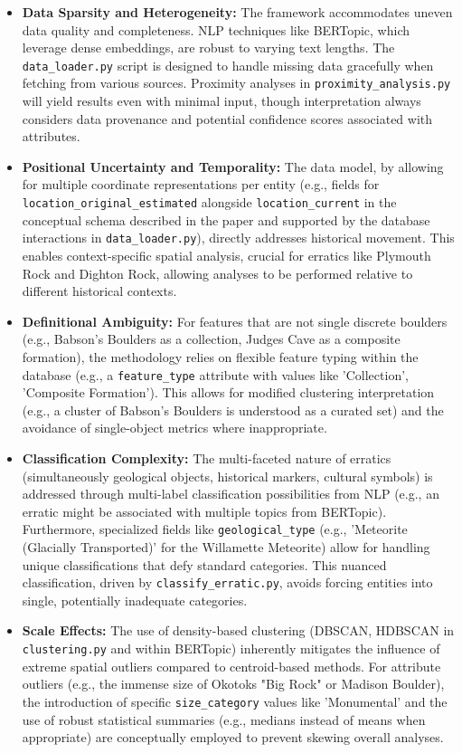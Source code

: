 \documentclass[
11pt, %
english, %
singlespacing, %
headsepline, %
]{MastersDoctoralThesis} %
\begin{document}
\begin{itemize}
    \item \textbf{Data Sparsity and Heterogeneity:} The framework accommodates uneven data quality and completeness. NLP techniques like BERTopic, which leverage dense embeddings, are robust to varying text lengths. The \texttt{data\_loader.py} script is designed to handle missing data gracefully when fetching from various sources. Proximity analyses in \texttt{proximity\_analysis.py} will yield results even with minimal input, though interpretation always considers data provenance and potential confidence scores associated with attributes.
    \item \textbf{Positional Uncertainty and Temporality:} The data model, by allowing for multiple coordinate representations per entity (e.g., fields for\\
    \texttt{location\_original\_estimated} alongside \texttt{location\_current} in the conceptual schema described in the paper and supported by the database interactions in \texttt{data\_loader.py}), directly addresses historical movement. This enables context-specific spatial analysis, crucial for erratics like Plymouth Rock and Dighton Rock, allowing analyses to be performed relative to different historical contexts.
    \item \textbf{Definitional Ambiguity:} For features that are not single discrete boulders (e.g., Babson's Boulders as a collection, Judges Cave as a composite formation), the methodology relies on flexible feature typing within the database (e.g., a \texttt{feature\_type} attribute with values like 'Collection', 'Composite Formation'). This allows for modified clustering interpretation (e.g., a cluster of Babson's Boulders is understood as a curated set) and the avoidance of single-object metrics where inappropriate.
    \item \textbf{Classification Complexity:} The multi-faceted nature of erratics (simultaneously geological objects, historical markers, cultural symbols) is addressed through multi-label classification possibilities from NLP (e.g., an erratic might be associated with multiple topics from BERTopic). Furthermore, specialized fields like \texttt{geological\_type} (e.g., 'Meteorite (Glacially Transported)' for the Willamette Meteorite) allow for handling unique classifications that defy standard categories. This nuanced classification, driven by \texttt{classify\_erratic.py}, avoids forcing entities into single, potentially inadequate categories.
    \item \textbf{Scale Effects:} The use of density-based clustering (DBSCAN, HDBSCAN in \texttt{clustering.py} and within BERTopic) inherently mitigates the influence of extreme spatial outliers compared to centroid-based methods. For attribute outliers (e.g., the immense size of Okotoks "Big Rock" or Madison Boulder), the introduction of specific \texttt{size\_category} values like 'Monumental' and the use of robust statistical summaries (e.g., medians instead of means when appropriate) are conceptually employed to prevent skewing overall analyses.

\end{itemize}
\end{document}
